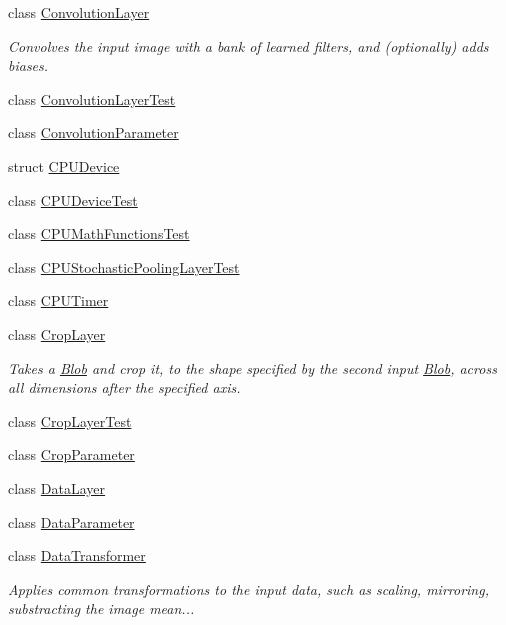 \begin{DoxyCompactItemize}
\item 
class \mbox{\hyperlink{classcaffe_1_1_convolution_layer}{Convolution\+Layer}}
\begin{DoxyCompactList}\small\item\em Convolves the input image with a bank of learned filters, and (optionally) adds biases. \end{DoxyCompactList}\item 
class \mbox{\hyperlink{classcaffe_1_1_convolution_layer_test}{Convolution\+Layer\+Test}}
\item 
class \mbox{\hyperlink{classcaffe_1_1_convolution_parameter}{Convolution\+Parameter}}
\item 
struct \mbox{\hyperlink{structcaffe_1_1_c_p_u_device}{C\+P\+U\+Device}}
\item 
class \mbox{\hyperlink{classcaffe_1_1_c_p_u_device_test}{C\+P\+U\+Device\+Test}}
\item 
class \mbox{\hyperlink{classcaffe_1_1_c_p_u_math_functions_test}{C\+P\+U\+Math\+Functions\+Test}}
\item 
class \mbox{\hyperlink{classcaffe_1_1_c_p_u_stochastic_pooling_layer_test}{C\+P\+U\+Stochastic\+Pooling\+Layer\+Test}}
\item 
class \mbox{\hyperlink{classcaffe_1_1_c_p_u_timer}{C\+P\+U\+Timer}}
\item 
class \mbox{\hyperlink{classcaffe_1_1_crop_layer}{Crop\+Layer}}
\begin{DoxyCompactList}\small\item\em Takes a \mbox{\hyperlink{classcaffe_1_1_blob}{Blob}} and crop it, to the shape specified by the second input \mbox{\hyperlink{classcaffe_1_1_blob}{Blob}}, across all dimensions after the specified axis. \end{DoxyCompactList}\item 
class \mbox{\hyperlink{classcaffe_1_1_crop_layer_test}{Crop\+Layer\+Test}}
\item 
class \mbox{\hyperlink{classcaffe_1_1_crop_parameter}{Crop\+Parameter}}
\item 
class \mbox{\hyperlink{classcaffe_1_1_data_layer}{Data\+Layer}}
\item 
class \mbox{\hyperlink{classcaffe_1_1_data_parameter}{Data\+Parameter}}
\item 
class \mbox{\hyperlink{classcaffe_1_1_data_transformer}{Data\+Transformer}}
\begin{DoxyCompactList}\small\item\em Applies common transformations to the input data, such as scaling, mirroring, substracting the image mean... \end{DoxyCompactList}\item 

\end{DoxyCompactItemize}
